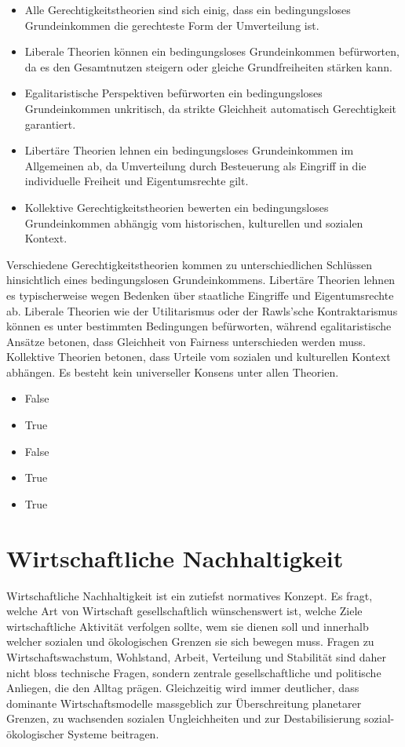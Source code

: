 \documentclass[
  nswissgerman,
  a4paper,
  DIV=11,
  numbers=noendperiod,
  oneside,
  openany]{scrreprt}
\providecommand{\tightlist}{%
  \setlength{\itemsep}{0pt}\setlength{\parskip}{0pt}}
\begin{document}
\begin{itemize}
\tightlist
\item[$\square$]
  Alle Gerechtigkeitstheorien sind sich einig, dass ein bedingungsloses
  Grundeinkommen die gerechteste Form der Umverteilung ist.
\item[$\square$]
  Liberale Theorien können ein bedingungsloses Grundeinkommen
  befürworten, da es den Gesamtnutzen steigern oder gleiche
  Grundfreiheiten stärken kann.
\item[$\square$]
  Egalitaristische Perspektiven befürworten ein bedingungsloses
  Grundeinkommen unkritisch, da strikte Gleichheit automatisch
  Gerechtigkeit garantiert.
\item[$\square$]
  Libertäre Theorien lehnen ein bedingungsloses Grundeinkommen im
  Allgemeinen ab, da Umverteilung durch Besteuerung als Eingriff in die
  individuelle Freiheit und Eigentumsrechte gilt.
\item[$\square$]
  Kollektive Gerechtigkeitstheorien bewerten ein bedingungsloses
  Grundeinkommen abhängig vom historischen, kulturellen und sozialen
  Kontext.
\end{itemize}

Verschiedene Gerechtigkeitstheorien kommen zu unterschiedlichen
Schlüssen hinsichtlich eines bedingungslosen Grundeinkommens. Libertäre
Theorien lehnen es typischerweise wegen Bedenken über staatliche
Eingriffe und Eigentumsrechte ab. Liberale Theorien wie der
Utilitarismus oder der Rawls'sche Kontraktarismus können es unter
bestimmten Bedingungen befürworten, während egalitaristische Ansätze
betonen, dass Gleichheit von Fairness unterschieden werden muss.
Kollektive Theorien betonen, dass Urteile vom sozialen und kulturellen
Kontext abhängen. Es besteht kein universeller Konsens unter allen
Theorien.

\begin{itemize}
\tightlist
\item
  False
\item
  True
\item
  False
\item
  True
\item
  True
\end{itemize}

\chapter{Wirtschaftliche
Nachhaltigkeit}\label{wirtschaftliche-nachhaltigkeit}

Wirtschaftliche Nachhaltigkeit ist ein zutiefst normatives Konzept. Es
fragt, welche Art von Wirtschaft gesellschaftlich wünschenswert ist,
welche Ziele wirtschaftliche Aktivität verfolgen sollte, wem sie dienen
soll und innerhalb welcher sozialen und ökologischen Grenzen sie sich
bewegen muss. Fragen zu Wirtschaftswachstum, Wohlstand, Arbeit,
Verteilung und Stabilität sind daher nicht bloss technische Fragen,
sondern zentrale gesellschaftliche und politische Anliegen, die den
Alltag prägen. Gleichzeitig wird immer deutlicher, dass dominante
Wirtschaftsmodelle massgeblich zur Überschreitung planetarer Grenzen, zu
wachsenden sozialen Ungleichheiten und zur Destabilisierung
sozial-ökologischer Systeme beitragen.
\end{document}
